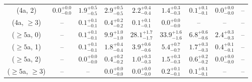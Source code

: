\begin{table}[h!]
{\begin{tabular}{ccccccccc}
	(4a, 2) & $0.0^{+ 0.0 }_{- 0.0 }$ & $1.9^{+ 0.5 }_{- 0.5 }$ & $2.9^{+ 0.5 }_{- 0.5 }$ & $2.2^{+ 0.4 }_{- 0.4 }$ & $1.4^{+ 0.3 }_{- 0.3 }$ & $0.1^{+ 0.1 }_{- 0.1 }$ & $0.0^{+ 0.0 }_{- 0.0 }$ & -- \\[0.5ex] 
	(4a, $\ge3$) & -- & $0.1^{+ 0.1 }_{- 0.1 }$ & $0.4^{+ 0.2 }_{- 0.2 }$ & $0.1^{+ 0.1 }_{- 0.1 }$ & $0.0^{+ 0.0 }_{- 0.0 }$ & -- & -- & -- \\[0.5ex] 
	($\ge5$a, 0) & -- & $0.1^{+ 0.1 }_{- 0.1 }$ & $9.9^{+ 1.0 }_{- 1.0 }$ & $28.1^{+ 1.7 }_{- 1.7 }$ & $33.9^{+ 1.6 }_{- 1.6 }$ & $6.8^{+ 0.6 }_{- 0.6 }$ & $2.4^{+ 0.3 }_{- 0.3 }$ & -- \\[0.5ex] 
	($\ge5$a, 1) & -- & $0.1^{+ 0.1 }_{- 0.1 }$ & $1.8^{+ 0.4 }_{- 0.4 }$ & $3.9^{+ 0.6 }_{- 0.6 }$ & $5.4^{+ 0.7 }_{- 0.7 }$ & $1.7^{+ 0.3 }_{- 0.3 }$ & $0.4^{+ 0.1 }_{- 0.1 }$ & -- \\[0.5ex] 
	($\ge5$a, 2) & -- & $0.0^{+ 0.0 }_{- 0.0 }$ & $0.4^{+ 0.2 }_{- 0.2 }$ & $1.0^{+ 0.3 }_{- 0.3 }$ & $1.5^{+ 0.3 }_{- 0.3 }$ & $0.6^{+ 0.2 }_{- 0.2 }$ & $0.0^{+ 0.0 }_{- 0.0 }$ & -- \\[0.5ex] 
	($\ge5$a, $\ge3$) & -- & -- & $0.0^{+ 0.0 }_{- 0.0 }$ & $0.0^{+ 0.0 }_{- 0.0 }$ & $0.2^{+ 0.1 }_{- 0.1 }$ & $0.1^{+ 0.1 }_{- 0.1 }$ & -- & -- \\[0.5ex] 
	\hline
	\hline
\end{tabular}}
\end{table}
